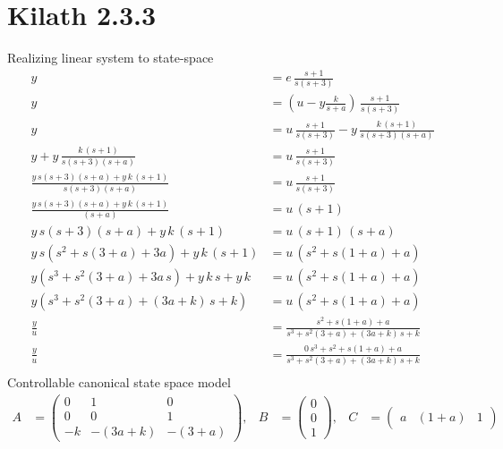\section{Kilath 2.3.3}
Realizing linear system to state-space
\begin{align*}
    y &= e\,\frac{s+1}{s\left(s+3\right)} \\ y &= \left(u - y\frac{k}{s+a}\right)\,\frac{s+1}{s\left(s+3\right)} \\ 
    y &= u\,\frac{s+1}{s\left(s+3\right)} - y\,\frac{k\,\left(s+1\right)}{s\left(s+3\right)\left(s+a\right)}\\
    y + y\,\frac{k\,\left(s+1\right)}{s\left(s+3\right)\left(s+a\right)} &= u\,\frac{s+1}{s\left(s+3\right)} \\
    \frac{y\,s\left(s+3\right)\left(s+a\right) + y\,k\,\left(s+1\right)}{s\left(s+3\right)\left(s+a\right)} &= u\,\frac{s+1}{s\left(s+3\right)}\\
    \frac{y\,s\left(s+3\right)\left(s+a\right) + y\,k\,\left(s+1\right)}{\left(s+a\right)} &= u\,\left(s+1\right) \\
    y\,s\left(s+3\right)\left(s+a\right) + y\,k\,\left(s+1\right) &= u\,\left(s+1\right)\,\left(s+a\right)\\
    y\,s\left(s^2+s\left(3+a\right)+3a\right) + y\,k\,\left(s+1\right) &= u\,\left(s^2+s\left(1+a\right)+a\right) \\
    y\left(s^3+s^2\left(3+a\right)+3a\,s\right) + y\,k\,s + y\,k &= u\,\left(s^2+s\left(1+a\right)+a\right) \\
    y\left(s^3+s^2\left(3+a\right)+\left(3a + k\right)\,s + k\right) &= u\,\left(s^2+s\left(1+a\right)+a\right) \\
    \frac{y}{u} &= \frac{s^2+s\left(1+a\right)+a}{s^3+s^2\left(3+a\right)+\left(3a + k\right)\,s + k}\\
    \frac{y}{u} &= \frac{0\,s^3 + s^2+s\left(1+a\right)+a}{s^3+s^2\left(3+a\right)+\left(3a + k\right)\,s + k}\\
\end{align*}
Controllable canonical state space model
\begin{align*}
    A &= \begin{pmatrix}
        0  & 1                    & 0\\
        0  & 0                    & 1\\     
        -k & -\left(3a + k\right) & -\left(3 + a\right)
    \end{pmatrix},
    & B &= \begin{pmatrix}
        0 \\
        0 \\
        1
    \end{pmatrix},
    & C &= \begin{pmatrix}
        a & \left(1+a\right) & 1
    \end{pmatrix}
\end{align*}
